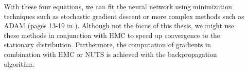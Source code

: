 With these four equations, we can fit the neural network using minimization techniques such as stochastic gradient descent or more complex methods such as ADAM (pages 13-19 in \cite{ml_for_physicists}). 
Although not the focus of this thesis, we might use these methods in conjunction with HMC to speed up convergence to the stationary distribution. Furthermore, the computation of gradients in combination with
HMC or NUTS is achieved with the backpropagation algorithm.
\begin{comment}

\subsection{Loss Function for Regression}
In this thesis, we are concerned with regression tasks. The activation function of the final layer $\sigma_L$ is then just the identity function. The typical loss function chosen to solve regression tasks is the $L_2$-norm, which for a single output can be written as 
\begin{equation}
    \mathcal{L}(y, \hat{y}) = \frac{1}{2}\norm{y-\hat{y}}_2^2,
\end{equation}
where $\hat{y}$ denotes the model output and $y$ the ground-truth. Now, the model output in this case is $\hat{y}_j = a_j^L = z_j^L$. Therefore, 
\begin{equation}
    \Delta_j^L = \pdv{\mathcal{L}}{z_j^L} = a_j^L - y_j.
\end{equation} 

\end{comment}

